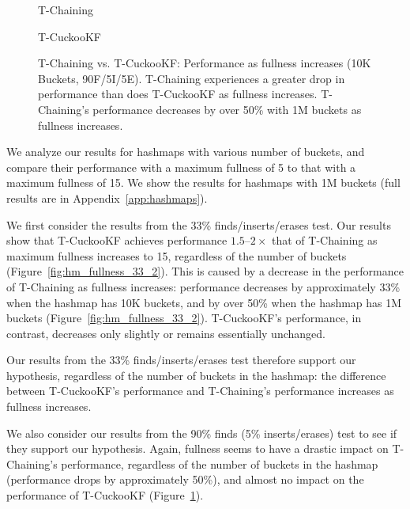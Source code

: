 \begin{figure}[ht!]
    \centering
    \begin{minipage}{0.70\textwidth}
    \caption*{T-Chaining}
        \vspace{12pt}
    \end{minipage}
    \begin{minipage}{0.70\textwidth}
    \caption*{T-CuckooKF}
    \end{minipage}
    \caption[T-Chaining vs. T-CuckooKF: Performance as fullness increases (1M Buckets, 90F/5I/5E)]{T-Chaining vs. T-CuckooKF: Performance as fullness increases (10K Buckets, 90F/5I/5E). T-Chaining experiences a greater drop in performance than does T-CuckooKF as fullness increases. T-Chaining's performance decreases by over 50\% with 1M buckets as fullness increases.}
    \label{fig:hm_fullness_90_2}
\end{figure}

We analyze our results for hashmaps with various number of buckets, and compare their performance with a maximum fullness of 5 to that with a maximum fullness of 15. We show the results for hashmaps with 1M buckets (full results are in Appendix~\ref{app:hashmaps}).

We first consider the results from the 33\% finds/inserts/erases test. Our results show that T-CuckooKF achieves performance $1.5$--$2\times$ that of T-Chaining as maximum fullness increases to 15, regardless of the number of buckets (Figure~\ref{fig:hm_fullness_33_2}). 
This is caused by a decrease in the performance of T-Chaining as fullness increases: performance decreases by approximately 33\% when the hashmap has 10K buckets, and by over 50\% when the hashmap has 1M buckets (Figure~\ref{fig:hm_fullness_33_2}). T-CuckooKF's performance, in contrast, decreases only slightly or remains essentially unchanged.

Our results from the 33\% finds/inserts/erases test therefore support our hypothesis, regardless of the number of buckets in the hashmap: the difference between T-CuckooKF's performance and T-Chaining's performance increases as fullness increases. 

We also consider our results from the 90\% finds (5\% inserts/erases) test to see if they support our hypothesis.
Again, fullness seems to have a drastic impact on T-Chaining's performance, regardless of the number of buckets in the hashmap (performance drops by approximately 50\%), and almost no impact on the performance of T-CuckooKF (Figure~\ref{fig:hm_fullness_90_2}). 

